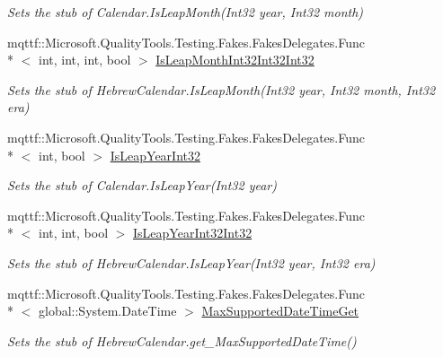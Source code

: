 \begin{DoxyCompactItemize}
\begin{DoxyCompactList}\small\item\em Sets the stub of Calendar.\-Is\-Leap\-Month(\-Int32 year, Int32 month)\end{DoxyCompactList}\item 
mqttf\-::\-Microsoft.\-Quality\-Tools.\-Testing.\-Fakes.\-Fakes\-Delegates.\-Func\\*
$<$ int, int, int, bool $>$ \hyperlink{class_system_1_1_globalization_1_1_fakes_1_1_stub_hebrew_calendar_a5945fcf154e52075ce06bea4508a0827}{Is\-Leap\-Month\-Int32\-Int32\-Int32}
\begin{DoxyCompactList}\small\item\em Sets the stub of Hebrew\-Calendar.\-Is\-Leap\-Month(\-Int32 year, Int32 month, Int32 era)\end{DoxyCompactList}\item 
mqttf\-::\-Microsoft.\-Quality\-Tools.\-Testing.\-Fakes.\-Fakes\-Delegates.\-Func\\*
$<$ int, bool $>$ \hyperlink{class_system_1_1_globalization_1_1_fakes_1_1_stub_hebrew_calendar_a3155d438a10754103caa5fc97658a271}{Is\-Leap\-Year\-Int32}
\begin{DoxyCompactList}\small\item\em Sets the stub of Calendar.\-Is\-Leap\-Year(\-Int32 year)\end{DoxyCompactList}\item 
mqttf\-::\-Microsoft.\-Quality\-Tools.\-Testing.\-Fakes.\-Fakes\-Delegates.\-Func\\*
$<$ int, int, bool $>$ \hyperlink{class_system_1_1_globalization_1_1_fakes_1_1_stub_hebrew_calendar_a15fb103c5b843a3e073986691110d4de}{Is\-Leap\-Year\-Int32\-Int32}
\begin{DoxyCompactList}\small\item\em Sets the stub of Hebrew\-Calendar.\-Is\-Leap\-Year(\-Int32 year, Int32 era)\end{DoxyCompactList}\item 
mqttf\-::\-Microsoft.\-Quality\-Tools.\-Testing.\-Fakes.\-Fakes\-Delegates.\-Func\\*
$<$ global\-::\-System.\-Date\-Time $>$ \hyperlink{class_system_1_1_globalization_1_1_fakes_1_1_stub_hebrew_calendar_a92b846f4e7dcee582377b3e4fa7ae540}{Max\-Supported\-Date\-Time\-Get}
\begin{DoxyCompactList}\small\item\em Sets the stub of Hebrew\-Calendar.\-get\-\_\-\-Max\-Supported\-Date\-Time()\end{DoxyCompactList}\item 

\end{DoxyCompactItemize}

